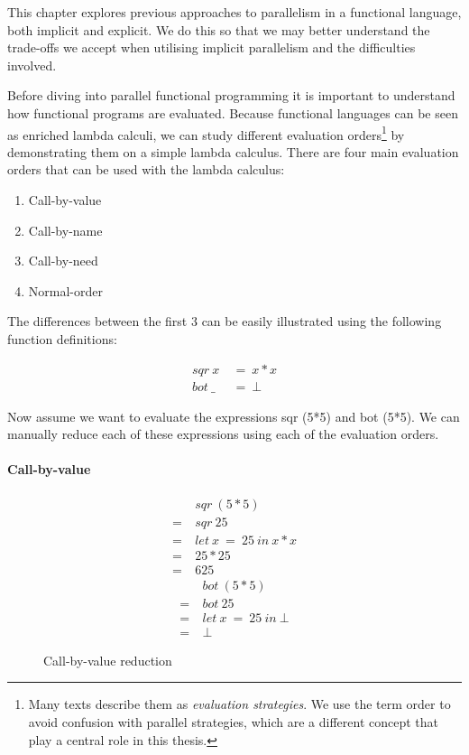This chapter explores previous approaches to parallelism in a
functional language, both implicit and explicit. We do this so that
we may better understand the trade-offs we accept when utilising
implicit parallelism and the difficulties involved.

Before diving into parallel functional programming it is important to
understand how functional programs are evaluated. Because functional languages
can be seen as enriched lambda calculi, we can study different evaluation
orders\footnote{Many texts describe them as \emph{evaluation strategies}.  We
use the term order to avoid confusion with parallel strategies, which are a
different concept that play a central role in this thesis.} by demonstrating
them on a simple lambda calculus. There are four main evaluation orders that
can be used with the lambda calculus:

    \begin{enumerate}
        \item Call-by-value
        \item Call-by-name
        \item Call-by-need
        \item Normal-order
    \end{enumerate}

The differences between the first 3 can be easily illustrated using the
following function definitions:

\begin{align*}
    sqr \ x \  &= \  x * x \\
    bot \ \_ \ &= \  \bot
\end{align*}

Now assume we want to evaluate the expressions \<sqr (5*5)\> and \<bot (5*5)\>.
We can manually reduce each of these expressions using each of the evaluation
orders.

\paragraph{Call-by-value}

\begin{figure}[!h]
\centering
\begin{multicols}{2}
\noindent
\begin{align*}
     &sqr\ (5*5) \\
  =\ &sqr\ 25 \\
  =\ &let\ x\ =\ 25\ in\ x * x \\
  =\ &25 * 25 \\
  =\ &625
\end{align*}
\begin{align*}
     &bot\ (5*5) \\
  =\ &bot\ 25 \\
  =\ &let\ x\ =\ 25\ in\ \bot \\
  =\ &\bot
\end{align*}
\end{multicols}
\caption{Call-by-value reduction}
\label{fig:call-by-value}
\end{figure}

